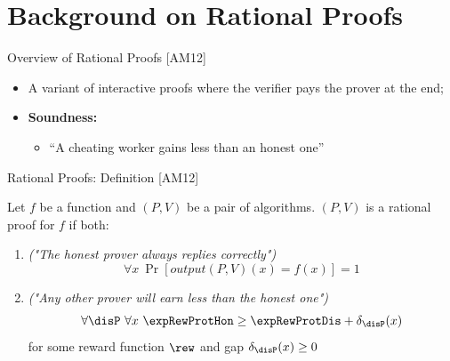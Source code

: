 \section{Background on Rational Proofs}

\begin{frame}{Overview of Rational Proofs [AM12]}
\begin{itemize}[<+- | alert@+>]
	\item A variant of interactive proofs where the verifier pays the prover at the end;
	\item \textbf{Soundness:}
	\begin{itemize}
		\item ``A cheating worker gains less than an honest one''
	\end{itemize}
\end{itemize}
\end{frame}


\begin{frame}{Rational Proofs: Definition [AM12]}
		\begin{framed}
			Let $f$ be a function and $(P,V)$ be a pair of algorithms. $(P,V)$ is a rational proof for $f$ if both:
			\onslide<+->
			\begin{enumerate}[<+- | alert@+>]
				\item \emph{("The honest prover always replies correctly")} 
				$$ \forall x\  \Pr[output(P,V)(x) = f(x) ] = 1$$
				\item \emph{("Any other prover will earn less than the honest one")}
				$$ \forall \disP \ \forall x \  \expRewProtHon \geq \expRewProtDis + \delta_{\disP}(x)  $$
				for some reward function $\rew$ and gap $\delta_{\disP}(x) \geq 0$
			\end{enumerate}
		\end{framed}
		
		\pause
		\vspace{0.5cm}
\end{frame}

